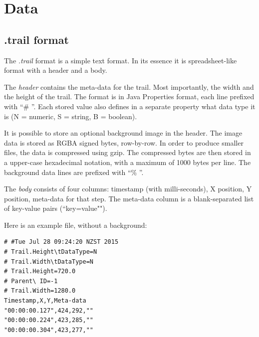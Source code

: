 \documentclass[a4paper]{book}
\begin{document}
\chapter{Data}
\section{.trail format}
The \textit{.trail} format is a simple text format. In its essence it is
spreadsheet-like format with a header and a body.

The \textit{header} contains the meta-data for the trail. Most importantly,
the width and the height of the trail. The format is in Java Properties format,
each line prefixed with ``\# ''. Each stored value also defines in a separate
property what data type it is (N = numeric, S = string, B = boolean).

It is possible to store an optional background image in the header. The image
data is stored as RGBA signed bytes, row-by-row. In order to produce smaller
files, the data is compressed using gzip\cite{gzip}. The compressed bytes are
then stored in a upper-case hexadecimal notation, with a maximum of 1000 bytes
per line. The background data lines are prefixed with ``\% ''.

The \textit{body} consists of four columns: timestamp (with milli-seconds), X position,
Y position, meta-data for that step. The meta-data column is a blank-separated list of
key-value pairs (``key=value"").

Here is an example file, without a background:

\begin{verbatim}
# #Tue Jul 28 09:24:20 NZST 2015
# Trail.Height\tDataType=N
# Trail.Width\tDataType=N
# Trail.Height=720.0
# Parent\ ID=-1
# Trail.Width=1280.0
Timestamp,X,Y,Meta-data
"00:00:00.127",424,292,""
"00:00:00.224",423,285,""
"00:00:00.304",423,277,""
\end{verbatim}



\end{document}
